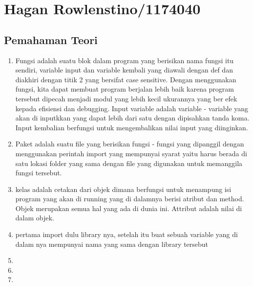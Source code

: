 \section{Hagan Rowlenstino/1174040}
    \subsection{Pemahaman Teori}
        \begin{enumerate}
            \item Fungsi adalah suatu blok dalam program yang berisikan nama fungsi itu sendiri, variable input dan variable kembali yang diawali dengan def dan diakhiri dengan titik 2 yang bersifat case sensitive. Dengan menggunakan fungsi, kita dapat membuat program berjalan lebih baik karena program tersebut dipecah menjadi modul yang lebih kecil ukurannya yang ber efek kepada efisiensi dan debugging. Input variable adalah variable - variable yang akan di inputkkan yang dapat lebih dari satu dengan dipisahkan tanda koma. Input kembalian berfungsi untuk mengembalikan nilai input yang diinginkan.

            

            \item Paket adalah suatu file yang berisikan fungsi - fungsi yang dipanggil dengan menggunakan perintah import yang mempunyai syarat yaitu harus berada di satu lokasi folder yang sama dengan file yang digunakan untuk memanggila fungsi tersebut.
            

            \item kelas adalah cetakan dari objek dimana berfungsi untuk menampung isi program yang akan di running yang di dalamnya berisi atribut dan method. Objek merupakan semua hal yang ada di dunia ini. Attribut adalah nilai di dalam objek.
            

            \item pertama import dulu library nya, setelah itu buat sebuah variable yang di dalam nya mempunyai nama yang sama dengan library tersebut
            

            \item 

            \item 

            \item 

        \end{enumerate}
